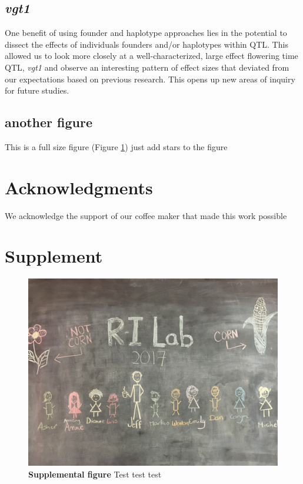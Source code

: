 \documentclass[article,9pt,twocolumn,twoside]{rilabRxiv}
\newcommand{\beginsupplement}{%
        \setcounter{table}{0}
        \renewcommand{\thetable}{S\arabic{table}}%
        \setcounter{figure}{0}
        \renewcommand{\thefigure}{S\arabic{figure}}%
     }
\begin{document}
\subsection{\emph{vgt1}}
One benefit of using founder and haplotype approaches lies in the potential to dissect the effects of individuals founders and/or haplotypes within QTL. This allowed us to look more closely at a well-characterized, large effect flowering time QTL, \emph{vgt1} and observe an interesting pattern of effect sizes that deviated from our expectations based on previous research. This opens up new areas of inquiry for future studies.


\subsection{another figure}
This is a full size figure (Figure \ref{fig:S1}) just add stars to the figure


\section{Acknowledgments}
We acknowledge the support of our coffee maker that made this work possible



\onecolumn
\section*{Supplement}



\beginsupplement


\blindtext
\begin{figure}[h!]
\includegraphics[width=.9\linewidth]{figures/lab_group.png}
\caption{\textbf{Supplemental figure} Test test test}
\label{fig:S1}
\end{figure}
\pagebreak
\end{document}
